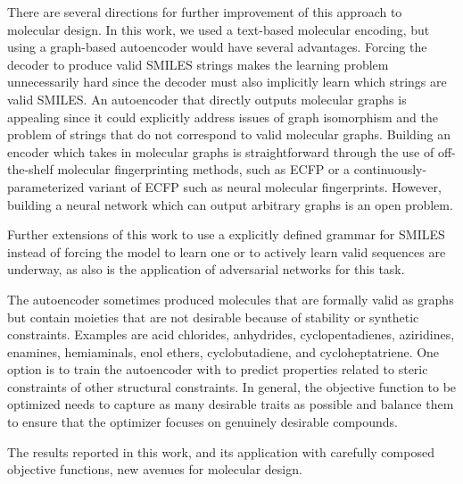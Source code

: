 \documentclass[journal=acscii,manuscript=article]{achemso}
\begin{document}
There are several directions for further improvement of this approach to molecular design. 
In this work, we used a text-based molecular encoding, but using a graph-based autoencoder would have several advantages.
Forcing the decoder to produce valid SMILES strings makes the learning problem unnecessarily hard since the decoder must also implicitly learn which strings are valid SMILES.
An autoencoder that directly outputs molecular graphs is appealing since it could explicitly address issues of graph isomorphism and the problem of strings that do not correspond to valid molecular graphs. Building an encoder which takes in molecular graphs is straightforward through the use of off-the-shelf molecular fingerprinting methods, such as ECFP\cite{ECFP2010} or a continuously-parameterized variant of ECFP such as neural molecular fingerprints.\cite{duvenaud2015convolutional}
However, building a neural network which can output arbitrary graphs is an open problem. 

Further extensions of this work to use a explicitly defined grammar for SMILES instead of forcing the model to learn one\cite{kusner2017grammar} or to actively learn valid sequences are underway, as also is the application of adversarial networks for this task.

The autoencoder sometimes produced molecules that are formally valid as graphs but contain moieties that are not desirable because of stability or synthetic constraints.  Examples are acid chlorides, anhydrides, cyclopentadienes, aziridines, enamines, hemiaminals, enol ethers, cyclobutadiene, and cycloheptatriene. One option is to train the autoencoder with to predict properties related to steric constraints of other structural constraints. In general, the objective function to be optimized needs to capture as many desirable traits as possible and balance them to ensure that the optimizer focuses on genuinely desirable compounds.  

The results reported in this work, and its application with carefully composed objective functions,  new avenues for molecular design.
\end{document}
